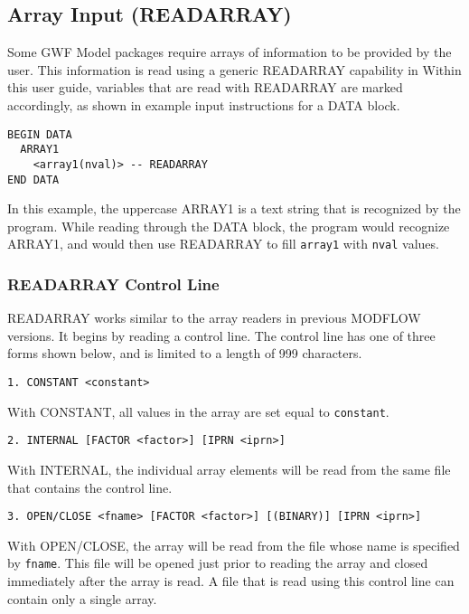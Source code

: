 \subsection{Array Input (READARRAY)}
Some GWF Model packages require arrays of information to be provided by the user.  This information is read using a generic READARRAY capability in \mfdot  Within this user guide, variables that are read with READARRAY are marked accordingly, as shown in example input instructions for a DATA block.  

\begin{lstlisting}[style=blockdefinition]
BEGIN DATA
  ARRAY1
    <array1(nval)> -- READARRAY
END DATA
\end{lstlisting}

\noindent In this example, the uppercase ARRAY1 is a text string that is recognized by the program.  While reading through the DATA block, the program would recognize ARRAY1, and would then use READARRAY to fill \texttt{array1} with \texttt{nval} values.

\subsubsection{READARRAY Control Line}

READARRAY works similar to the array readers in previous MODFLOW versions.  It begins by reading a control line.  The control line has one of three forms shown below, and is limited to a length of 999 characters.

\begin{lstlisting}[style=blockdefinition]
1. CONSTANT <constant> 
\end{lstlisting}
With CONSTANT, all values in the array are set equal to \texttt{constant}. 

\begin{lstlisting}[style=blockdefinition]
2. INTERNAL [FACTOR <factor>] [IPRN <iprn>] 
\end{lstlisting}
With INTERNAL, the individual array elements will be read from the same file that contains the control line. 

\begin{lstlisting}[style=blockdefinition]
3. OPEN/CLOSE <fname> [FACTOR <factor>] [(BINARY)] [IPRN <iprn>]
\end{lstlisting}
With OPEN/CLOSE, the array will be read from the file whose name is specified by \texttt{fname}. This file will be opened just prior to reading the array and closed immediately after the array is read. A file that is read using this control line can contain only a single array. 

